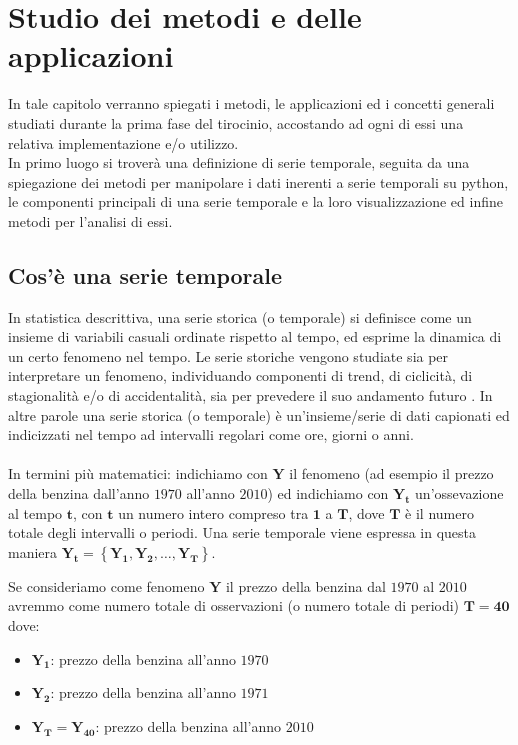 \section{Studio dei metodi e delle applicazioni}
In tale capitolo verranno spiegati i metodi, le applicazioni ed i concetti 
generali studiati durante la prima fase del tirocinio, accostando ad ogni 
di essi una relativa implementazione e/o utilizzo.\\
In primo luogo si troverà una definizione di serie temporale, seguita da
una spiegazione dei metodi per manipolare i dati inerenti a serie temporali 
su python, le componenti principali di una serie temporale e la loro visualizzazione
ed infine metodi per l'analisi di essi. 

\subsection{Cos'è una serie temporale}
In statistica descrittiva, una serie storica (o temporale) si definisce come un insieme di variabili 
casuali ordinate rispetto al tempo, ed esprime la dinamica di un certo 
fenomeno nel tempo. Le serie storiche vengono studiate sia per 
interpretare un fenomeno, individuando componenti di trend, di ciclicità, 
di stagionalità e/o di accidentalità, sia per prevedere il suo 
andamento futuro \cite{wiki:serie_storica}.
In altre parole una serie storica (o temporale) è un'insieme/serie di dati
capionati ed indicizzati nel tempo ad intervalli regolari come ore, giorni 
o anni.\\
\\
In termini più matematici: indichiamo con $\bm{Y}$ il fenomeno (ad esempio 
il prezzo della benzina dall'anno $1970$ all'anno $2010$) ed indichiamo con
$\bm{Y_t}$ un'ossevazione al tempo $\bm{t}$, con $\bm{t}$ un numero intero
compreso tra $\bm{1}$ a $\bm{T}$, dove $\bm{T}$ è il numero totale degli intervalli o 
periodi. Una serie temporale viene espressa in questa maniera 
$\bm{Y_t} = \left\{  \bm{Y_1}, \bm{Y_2}, \dots , \bm{Y_T}  \right\}$.

\begin{esempio} 

    Se consideriamo come fenomeno $\bm{Y}$ il prezzo della benzina dal $1970$ al $2010$
    avremmo come numero totale di osservazioni (o numero totale di periodi) 
    $\bm{T} = \bm{40}$ dove:
    \begin{itemize}
        \setlength\itemsep{-0.5em}
        \item $\bm{Y_1}$: prezzo della benzina all'anno $1970$
        \item $\bm{Y_2}$: prezzo della benzina all'anno $1971$
        \item $\bm{Y_T} = \bm{Y_{40}}$: prezzo della benzina all'anno $2010$
    \end{itemize}

\end{esempio}


